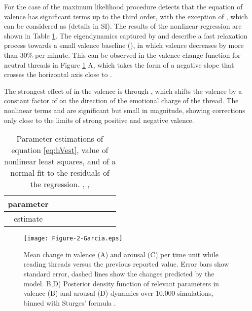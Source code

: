 \documentclass[nologo,url,11pt,a4paper]{ETHpaper}
\begin{document}
For the case of  the maximum likelihood procedure detects that the
equation of valence has significant terms up to the third order, with the
exception of , which can be considered as  (details in SI).
The results of the nonlinear regression are shown in Table \ref{tab:VregAll}. The
eigendynamics captured by  and  describe a
fast relaxation process towards a small valence baseline (), in which
valence decreases by more than 30\% per minute. This can be observed in the
valence change function for neutral threads in Figure
\ref{fig:VReadingChanges} A, which takes the form of a negative slope that
crosses the horizontal axis close to .

The strongest effect of  in the valence
is through , which shifts the valence by a constant factor of
 on the direction of the emotional charge of the thread. The nonlinear
terms  and  are significant but small in
magnitude, showing  corrections only close to the limits of strong positive and
negative valence.

\begin{table}[h]
\centering
\begin{tabular}{ c | c  c  c  c  c| c  c c }
parameter 	& 		&    			&   			&    		&   		  
&   &   &   \\ \hline 
estimate    & 	& 	&  	&  &  &  &  & 
\end{tabular}
\caption{Parameter estimations of equation \ref{eq:hVest},  value of
nonlinear least squares, and   of a normal fit to the residuals of
the regression.    , ,
\label{tab:VregAll}}
\end{table}

\begin{figure}[!ht]
\begin{center}
\texttt{[image: Figure-2-Garcia.eps]}
\end{center}
\caption{ Mean change in valence (A) and arousal (C) per time unit while reading threads versus the previous reported value. 
Error bars show standard error, dashed lines show the changes predicted by the model.
B,D) Posterior density function of relevant parameters in valence (B) and arousal (D) dynamics over 10.000 simulations, binned with Sturges' formula \cite{Sturges1926}. \label{fig:VReadingChanges} } \end{figure}
\end{document}
